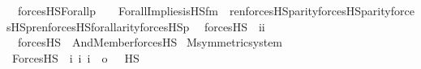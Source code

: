 \begin{isabellebody}
\ \ {\isachardoublequoteopen}forcesHS{\isacharprime}{\kern0pt}{\isacharparenleft}{\kern0pt}Forall{\isacharparenleft}{\kern0pt}p{\isacharparenright}{\kern0pt}{\isacharparenright}{\kern0pt}\ \ \ {\isacharequal}{\kern0pt}\ Forall{\isacharparenleft}{\kern0pt}Implies{\isacharparenleft}{\kern0pt}is{\isacharunderscore}{\kern0pt}HS{\isacharunderscore}{\kern0pt}fm{\isacharparenleft}{\kern0pt}{}{\isacharcomma}{\kern0pt}\ {}{\isacharparenright}{\kern0pt}{\isacharcomma}{\kern0pt}\ ren{\isacharparenleft}{\kern0pt}forcesHS{\isacharprime}{\kern0pt}{\isacharparenleft}{\kern0pt}p{\isacharparenright}{\kern0pt}{\isacharparenright}{\kern0pt}{\isacharbackquote}{\kern0pt}{\isacharparenleft}{\kern0pt}{}{\isasymunion}arity{\isacharparenleft}{\kern0pt}forcesHS{\isacharprime}{\kern0pt}{\isacharparenleft}{\kern0pt}p{\isacharparenright}{\kern0pt}{\isacharparenright}{\kern0pt}{\isacharparenright}{\kern0pt}{\isacharbackquote}{\kern0pt}{\isacharparenleft}{\kern0pt}{}{\isasymunion}arity{\isacharparenleft}{\kern0pt}forcesHS{\isacharprime}{\kern0pt}{\isacharparenleft}{\kern0pt}p{\isacharparenright}{\kern0pt}{\isacharparenright}{\kern0pt}{\isacharparenright}{\kern0pt}{\isacharbackquote}{\kern0pt}ren{\isacharunderscore}{\kern0pt}forcesHS{\isacharunderscore}{\kern0pt}forall{\isacharparenleft}{\kern0pt}arity{\isacharparenleft}{\kern0pt}forcesHS{\isacharprime}{\kern0pt}{\isacharparenleft}{\kern0pt}p{\isacharparenright}{\kern0pt}{\isacharparenright}{\kern0pt}{\isacharparenright}{\kern0pt}{\isacharparenright}{\kern0pt}{\isacharparenright}{\kern0pt}{\isachardoublequoteclose}\isanewline
\isanewline
{}\isamarkupfalse%
\isanewline
\ \ forcesHS\ {\isacharcolon}{\kern0pt}{\isacharcolon}{\kern0pt}\ {\isachardoublequoteopen}i{\isasymRightarrow}i{\isachardoublequoteclose}\ \isanewline
\ \ {\isachardoublequoteopen}forcesHS{\isacharparenleft}{\kern0pt}{\isasymphi}{\isacharparenright}{\kern0pt}\ {\isasymequiv}\ And{\isacharparenleft}{\kern0pt}Member{\isacharparenleft}{\kern0pt}{}{\isacharcomma}{\kern0pt}{}{\isacharparenright}{\kern0pt}{\isacharcomma}{\kern0pt}forcesHS{\isacharprime}{\kern0pt}{\isacharparenleft}{\kern0pt}{\isasymphi}{\isacharparenright}{\kern0pt}{\isacharparenright}{\kern0pt}{\isachardoublequoteclose}\isanewline
\isanewline
{}\isamarkupfalse%
\ M{\isacharunderscore}{\kern0pt}symmetric{\isacharunderscore}{\kern0pt}system\ \ \isanewline
\isanewline
{}\isamarkupfalse%
\ ForcesHS\ {\isacharcolon}{\kern0pt}{\isacharcolon}{\kern0pt}\ {\isachardoublequoteopen}{\isacharbrackleft}{\kern0pt}i{\isacharcomma}{\kern0pt}\ i{\isacharcomma}{\kern0pt}\ i{\isacharbrackright}{\kern0pt}\ {\isasymRightarrow}\ o{\isachardoublequoteclose}\ \ {\isacharparenleft}{\kern0pt}{\isachardoublequoteopen}{\isacharunderscore}{\kern0pt}\ {\isasymtturnstile}HS\ {\isacharunderscore}{\kern0pt}\ {\isacharunderscore}{\kern0pt}{\isachardoublequoteclose}\ {\isacharbrackleft}{\kern0pt}{}{}{\isacharcomma}{\kern0pt}{}{}{\isacharcomma}{\kern0pt}{}{}{\isacharbrackright}{\kern0pt}\ {}{}{\isacharparenright}{\kern0pt}\ \isanewline

\end{isabellebody}

